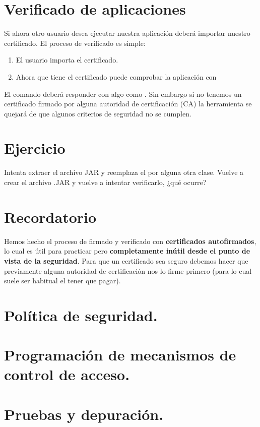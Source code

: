 \documentclass[a4paper,12pt,spanish]{sphinxmanual}
\begin{document}
\section{Verificado de aplicaciones}
\label{textos/tema5:verificado-de-aplicaciones}
Si ahora otro usuario desea ejecutar nuestra aplicación deberá importar nuestro certificado. El proceso de verificado es simple:
\begin{enumerate}
\item {} 
El usuario importa el certificado.

\item {} 
Ahora que tiene el certificado puede comprobar la aplicación con 

\end{enumerate}

El comando deberá responder con algo como . Sin embargo si no tenemos un certificado firmado por alguna autoridad de certificación (CA) la herramienta se quejará de que algunos criterios de seguridad no se cumplen.


\section{Ejercicio}
\label{textos/tema5:ejercicio}
Intenta extraer el archivo JAR y reemplaza el  por alguna otra clase. Vuelve a crear el archivo .JAR y vuelve a intentar verificarlo, ¿qué ocurre?


\section{Recordatorio}
\label{textos/tema5:recordatorio}
Hemos hecho el proceso de firmado y verificado con \textbf{certificados autofirmados}, lo cual es útil para practicar pero \textbf{completamente inútil desde el punto de vista de la seguridad}. Para que un certificado sea seguro debemos hacer que previamente alguna autoridad de certificación nos lo firme primero (para lo cual suele ser habitual el tener que pagar).


\section{Política de seguridad.}
\label{textos/tema5:politica-de-seguridad}

\section{Programación de mecanismos de control de acceso.}
\label{textos/tema5:programacion-de-mecanismos-de-control-de-acceso}

\section{Pruebas y depuración.}
\label{textos/tema5:pruebas-y-depuracion}


\renewcommand{\indexname}{Índice}
\printindex
\end{document}
